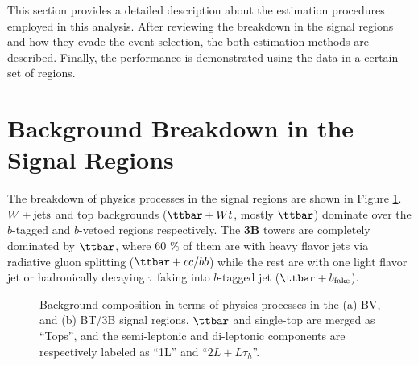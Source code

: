 This section provides a detailed description about the estimation procedures employed in this analysis. 
After reviewing the breakdown in the signal regions and how they evade the event selection, the both estimation methods are described. 
Finally, the performance is demonstrated using the data in a certain set of regions.


\section{Background Breakdown in the Signal Regions} \label{sec::BGcomposition}
The breakdown of physics processes in the signal regions are shown in Figure \ref{fig::BGestimation::BGcomposition_splitLv2}. $W+\mathrm{jets}$ and top backgrounds ($\ttbar+Wt$, mostly $\ttbar$) dominate over the $b$-tagged and $b$-vetoed regions respectively.
The \textbf{3B} towers are completely dominated by $\ttbar$, where 60 $\%$ of them are with heavy flavor jets via radiative gluon splitting ($\ttbar+cc/bb$) while the rest are with one light flavor jet or hadronically decaying $\tau$ faking into $b$-tagged jet ($\ttbar+b_{\mathrm{fake}}$).  \\

\begin{figure}[h]
  \centering
    \caption{ Background composition in terms of physics processes in the (a) BV, and (b) BT/3B signal regions. $\ttbar$ and single-top are merged as ``Tops'', and the semi-leptonic and di-leptonic components are respectively labeled as ``1L'' and ``$2L+L\tau_h$''. \label{fig::BGestimation::BGcomposition_splitLv2} }
\end{figure}



